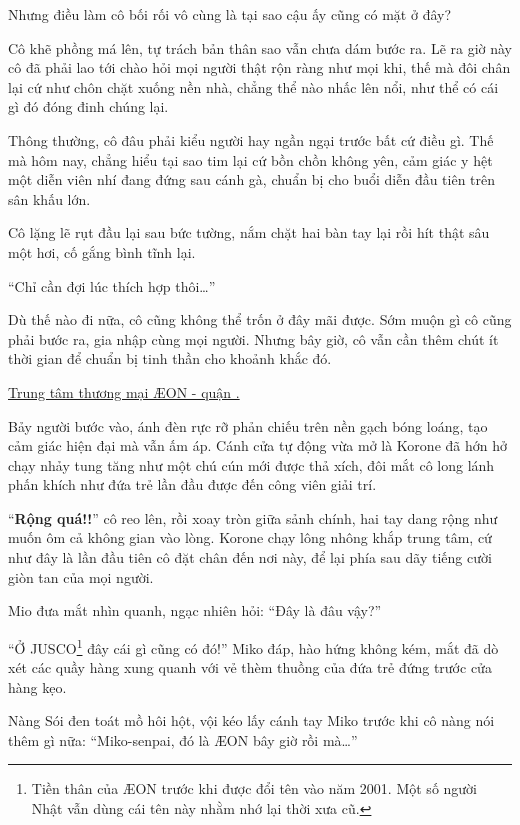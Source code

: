 \documentclass[../main.tex]{subfiles}
\begin{document}
Nhưng điều làm cô bối rối vô cùng là tại sao cậu ấy cũng có mặt ở đây?

Cô khẽ phồng má lên, tự trách bản thân sao vẫn chưa dám bước ra. Lẽ ra giờ này cô đã phải lao tới chào hỏi mọi người thật rộn ràng như mọi khi, thế mà đôi chân lại cứ như chôn chặt xuống nền nhà, chẳng thể nào nhấc lên nổi, như thể có cái gì đó đóng đinh chúng lại.

Thông thường, cô đâu phải kiểu người hay ngần ngại trước bất cứ điều gì. Thế mà hôm nay, chẳng hiểu tại sao tim lại cứ bồn chồn không yên, cảm giác y hệt một diễn viên nhí đang đứng sau cánh gà, chuẩn bị cho buổi diễn đầu tiên trên sân khấu lớn.

Cô lặng lẽ rụt đầu lại sau bức tường, nắm chặt hai bàn tay lại rồi hít thật sâu một hơi, cố gắng bình tĩnh lại.

``Chỉ cần đợi lúc thích hợp thôi\dots''

Dù thế nào đi nữa, cô cũng không thể trốn ở đây mãi được. Sớm muộn gì cô cũng phải bước ra, gia nhập cùng mọi người. Nhưng bây giờ, cô vẫn cần thêm chút ít thời gian để chuẩn bị tinh thần cho khoảnh khắc đó.

\il

\begin{center}
  \uline{Trung tâm thương mại \AE ON - quận .}
\end{center}

Bảy người bước vào, ánh đèn rực rỡ phản chiếu trên nền gạch bóng loáng, tạo cảm giác hiện đại mà vẫn ấm áp. Cánh cửa tự động vừa mở là Korone đã hớn hở chạy nhảy tung tăng như một chú cún mới được thả xích, đôi mắt cô long lánh phấn khích như đứa trẻ lần đầu được đến công viên giải trí.


``\textbf{Rộng quá!!}'' cô reo lên, rồi xoay tròn giữa sảnh chính, hai tay dang rộng như muốn ôm cả không gian vào lòng. Korone chạy lông nhông khắp trung tâm, cứ như đây là lần đầu tiên cô đặt chân đến nơi này, để lại phía sau dãy tiếng cười giòn tan của mọi người.

Mio đưa mắt nhìn quanh, ngạc nhiên hỏi: ``Đây là đâu vậy?''

``Ở JUSCO\footnote{Tiền thân của \AE ON trước khi được đổi tên vào năm 2001. Một số người Nhật vẫn dùng cái tên này nhằm nhớ lại thời xưa cũ.} đây cái gì cũng có đó!'' Miko đáp, hào hứng không kém, mắt đã dò xét các quầy hàng xung quanh với vẻ thèm thuồng của đứa trẻ đứng trước cửa hàng kẹo.

Nàng Sói đen toát mồ hôi hột, vội kéo lấy cánh tay Miko trước khi cô nàng nói thêm gì nữa: ``Miko-senpai, đó là \AE ON bây giờ rồi mà\dots''
\end{document}
